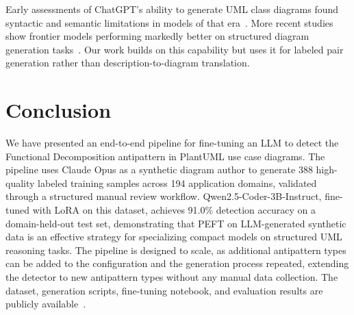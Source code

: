 \documentclass[12pt, a4paper]{article}
\begin{document}
Early assessments of ChatGPT's ability to generate UML class diagrams found
syntactic and semantic limitations in models of that era~\cite{camara2023chatgptuml}.
More recent studies show frontier models performing markedly better on
structured diagram generation tasks~\cite{enase26,alsayegh2026stride}.
Our work builds on this capability but uses it for labeled pair
generation rather than description-to-diagram translation.



\section{Conclusion}
\label{sec:conclusion}

We have presented an end-to-end pipeline for fine-tuning an LLM
to detect the Functional Decomposition antipattern in PlantUML use case
diagrams.  The pipeline uses Claude Opus as a synthetic diagram author to
generate 388 high-quality labeled training samples across 194 application
domains, validated through a structured manual review workflow.
Qwen2.5-Coder-3B-Instruct, fine-tuned with LoRA on this dataset, achieves
91.0\% detection accuracy on a domain-held-out test set, demonstrating that
PEFT on LLM-generated synthetic data is an
effective strategy for specializing compact models on structured UML
reasoning tasks.  The pipeline is designed to scale, as additional antipattern
types can be added to the configuration and the generation process repeated,
extending the detector to new antipattern types without any manual data collection.
The dataset, generation scripts, fine-tuning notebook, and evaluation results are
publicly available~\cite{khan2026repo}.


\setlength{\bibsep}{4pt}

\end{document}
